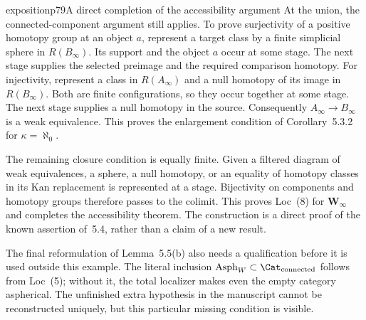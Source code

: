 \begin{dcomment}{exposition}{p79}{A direct completion of the accessibility argument}
At the union, the connected-component argument still applies. To prove surjectivity of a positive homotopy group at an object $a$, represent a target class by a finite simplicial sphere in $R(B_\infty)$. Its support and the object $a$ occur at some stage. The next stage supplies the selected preimage and the required comparison homotopy. For injectivity, represent a class in $R(A_\infty)$ and a null homotopy of its image in $R(B_\infty)$. Both are finite configurations, so they occur together at some stage. The next stage supplies a null homotopy in the source. Consequently $A_\infty\to B_\infty$ is a weak equivalence. This proves the enlargement condition of Corollary~5.3.2 for $\kappa=\aleph_0$.

The remaining closure condition is equally finite. Given a filtered diagram of weak equivalences, a sphere, a null homotopy, or an equality of homotopy classes in its Kan replacement is represented at a stage. Bijectivity on components and homotopy groups therefore passes to the colimit. This proves Loc~(8) for $\mathbf W_\infty$ and completes the accessibility theorem. The construction is a direct proof of the known assertion of~5.4, rather than a claim of a new result.

The final reformulation of Lemma~5.5(b) also needs a qualification before it is used outside this example. The literal inclusion $\operatorname{Asph}_W\subset\Cat_{\rm connected}$ follows from Loc~(5); without it, the total localizer makes even the empty category aspherical. The unfinished extra hypothesis in the manuscript cannot be reconstructed uniquely, but this particular missing condition is visible.
\end{dcomment}

